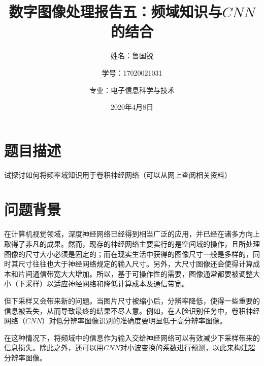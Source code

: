 \documentclass[UTF8]{ctexart}
\title{数字图像处理报告五：频域知识与$CNN$的结合}
\author{姓名：鲁国锐 \protect\newline
\and 学号：17020021031 \\
\and 专业：电子信息科学与技术}
\date{2020年4月8日}
\begin{document}
	\maketitle
	\renewcommand{\contentsname}{目录}
	\renewcommand{\listfigurename}{插图目录}
	\renewcommand{\listtablename}{表格目录}
	\renewcommand{\refname}{参考文献}
	\renewcommand{\abstractname}{摘要}
	\renewcommand{\indexname}{索引}
	\renewcommand{\tablename}{表}
	\renewcommand{\figurename}{图}
	
	
	
	\tableofcontents
	\newpage
	
	\hypersetup{
	bookmarks=true,
	colorlinks=true,
	linkcolor=red,
	urlcolor=blue
	}
	\section{题目描述}
	\indent 试探讨如何将频率域知识用于卷积神经网络（可以从网上查阅相关资料）

			
		


	
	\section{问题背景}\label{background}
        \indent 在计算机视觉领域，深度神经网络已经得到相当广泛的应用，并已经在诸多方向上取得了非凡的成果。然而，现存的神经网络主要实行的是空间域的操作，且所处理图像的尺寸大小必须是固定的\cite{xu2020learning}；而在现实生活中获得的图像尺寸一般是多样的，同时其尺寸往往也大于神经网络规定的输入尺寸。另外，大尺寸图像还会使得计算成本和片间通信带宽大大增加\cite{xu2020learning}。所以，基于可操作性的需要，图像通常都要被调整大小（下采样）以适应神经网络和降低计算成本及通信带宽\cite{xu2020learning}。
        
        \indent 但下采样又会带来新的问题。当图片尺寸被缩小后，分辨率降低，使得一些重要的信息被丢失\cite{xu2020learning}，从而导致最终的结果不尽人意。例如，在人脸识别任务中，卷积神经网络（$CNN$）对低分辨率图像识别的准确度要明显低于高分辨率图像\cite{huang2017wavelet}。
        
        \indent 在这种情况下，将频域中的信息作为输入交给神经网络可以有效减少下采样带来的信息损失\cite{xu2020learning}。除此之外，还可以用$CNN$对小波变换的系数进行预测，以此来构建超分辨率图像\cite{huang2017wavelet}。
    
\end{document}
